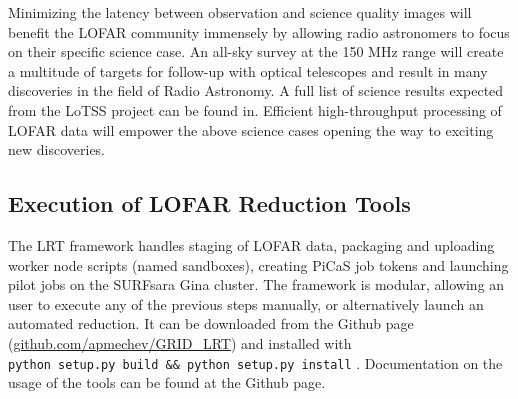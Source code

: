 Minimizing the latency between observation and science quality images will benefit the LOFAR community immensely by allowing radio astronomers to focus on their specific science case. An all-sky survey at the 150 MHz range will create a multitude of targets for follow-up with optical telescopes and result in many discoveries in the field of Radio Astronomy. A full list of science results expected from the LoTSS project can be found in\cite{lotss}. Efficient high-throughput processing of LOFAR data will empower the above science cases opening the way to  exciting new discoveries.


\begin{subappendices}

\section{Execution of LOFAR Reduction Tools }\label{sec:ch3_appendix_1}

The LRT framework handles staging of LOFAR data, packaging and uploading worker node scripts (named sandboxes), creating PiCaS job tokens and launching pilot jobs on the SURFsara Gina cluster. The framework is modular, allowing an user to execute any of the previous steps manually, or alternatively launch an automated reduction. It can be downloaded from the Github page (\href{https://github.com/apmechev/GRID_LRT}{github.com/apmechev/GRID\_LRT}) and installed with \\
\verb|python setup.py build && python setup.py install| . Documentation on the usage of the tools can be found at the Github page. 
\end{subappendices}


